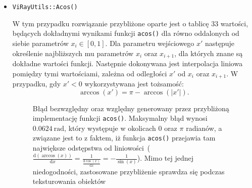\begin{enumerate}
\begin{itemize}
\item \texttt{ViRayUtils::Acos()}

W tym przypadku rozwiązanie przybliżone oparte jest o tablicę 33 wartości, będących dokładnymi wynikami funkcji \texttt{acos()} dla równo oddalonych od siebie parametrów $x_i \in [0, 1]$. Dla parametru wejściowego $x'$ następuje określenie najbliższych mu parametrów $x_i$ oraz $x_{i+1}$, dla których znane są dokładne wartości funkcji. Następnie dokonywana jest interpolacja liniowa pomiędzy tymi wartościami, zależna od odległości $x'$ od $x_i$ oraz $x_{i+1}$. W przypadku, gdy $x' < 0$ wykorzystywana jest tożsamość:
\begin{equation}
\arccos(x') = \pi - \arccos(|x'|).
\end{equation}

\begin{figure}[H]
\centering
{}
\caption[Błąd bezwzględny oraz względny generowany przez przybliżoną implementację funkcji \texttt{acos()}]{Błąd bezwzględny oraz względny generowany przez przybliżoną implementację funkcji \texttt{acos()}. Maksymalny błąd wynosi $0.0624\ \mathrm{rad}$, który występuje w okolicach 0 oraz $\pi$ radianów, a związane jest to z faktem, iż funkcja \texttt{acos()} przejawia tam największe odstępstwa od liniowości~($\frac{\mathrm{d}(\arccos(x))}{\mathrm{d}x} = \frac{1}{\frac{\mathrm{d}\cos(x)}{\mathrm{d}x}} = -\frac{1}{\sin(x)}$). Mimo tej jednej niedogodności, zastosowane przybliżenie sprawdza się podczas teksturowania obiektów}
\label{ch3:img:acos_error}
\end{figure}


\end{itemize}
\end{enumerate}
